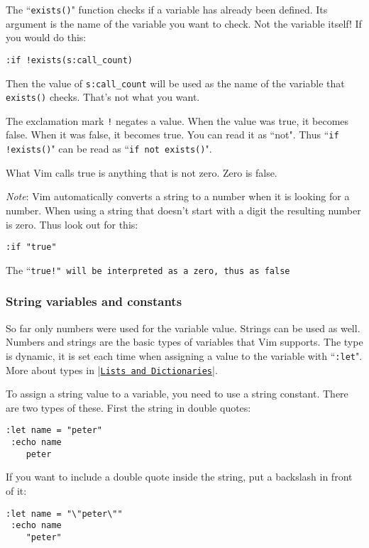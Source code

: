 The ``\texttt{exists()}" function checks if a variable has already been defined.
Its argument is the name of the variable you want to check.
Not the variable itself!  If you would do this:

\begin{Verbatim}[samepage=true]
 :if !exists(s:call_count)
\end{Verbatim}

Then the value of \texttt{s:call\_count} will be used as the name of the variable that \texttt{exists()} checks.
That's not what you want.

The exclamation mark \texttt{!} negates a value.
When the value was true, it becomes false.
When it was false, it becomes true.
You can read it as ``not".
Thus ``\texttt{if !exists()}" can be read as ``\texttt{if not exists()}".

What Vim calls true is anything that is not zero.
Zero is false.

\emph{Note}:
Vim automatically converts a string to a number when it is looking for a number.
When using a string that doesn't start with a digit the resulting number is zero.
Thus look out for this:

\begin{Verbatim}[samepage=true]
  :if "true"
\end{Verbatim}

The ``\texttt{true!" will be interpreted as a zero, thus as false}
\subsubsection{String variables and constants}
So far only numbers were used for the variable value.
Strings can be used as well.
Numbers and strings are the basic types of variables that Vim supports.
The type is dynamic, it is set each time when assigning a value to the variable with ``\texttt{:let}".
More about types in |\hyperref[Lists and Dictionaries]{\texttt{Lists and Dictionaries}}|.

To assign a string value to a variable, you need to use a string constant.
There are two types of these.
First the string in double quotes:

\begin{Verbatim}[samepage=true]
 :let name = "peter"
 :echo name
    peter
\end{Verbatim}

If you want to include a double quote inside the string, put a backslash in front of it:

\begin{Verbatim}[samepage=true]
 :let name = "\"peter\""
 :echo name
    "peter"
\end{Verbatim}

